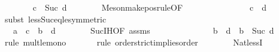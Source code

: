 \begin{isabellebody}
\isanewline
\ \ \ \ \isamarkupfalse%
\ {}{\isacharcolon}{\kern0pt}\ {\isachardoublequoteopen}c\ {\isacharless}{\kern0pt}\ Suc\ d{\isachardoublequoteclose}\isanewline
\ \ \ \ \ \ \isamarkupfalse%
\ Meson{\isachardot}{\kern0pt}make{\isacharunderscore}{\kern0pt}pos{\isacharunderscore}{\kern0pt}rule{\isacharprime}{\kern0pt}{\isacharbrackleft}{\kern0pt}OF\ {}\ {}{\isacharbrackright}{\kern0pt}\isanewline
\ \ \ \ \ \ \isacommand{{\isachardot}{\kern0pt}}\isamarkupfalse%
\isanewline
\isanewline
\ \ \ \ \isamarkupfalse%
\ {}{\isacharcolon}{\kern0pt}\ {\isachardoublequoteopen}c\ {\isasymle}\ d{\isachardoublequoteclose}\isanewline
\ \ \ \ \ \ \isamarkupfalse%
{\isacharparenleft}{\kern0pt}subst\ less{\isacharunderscore}{\kern0pt}Suc{\isacharunderscore}{\kern0pt}eq{\isacharunderscore}{\kern0pt}le{\isacharbrackleft}{\kern0pt}symmetric{\isacharbrackright}{\kern0pt}{\isacharparenright}{\kern0pt}\isanewline
\ \ \ \ \ \ \isamarkupfalse%
\ {}\isanewline
\ \ \ \ \ \ \isacommand{{\isachardot}{\kern0pt}}\isamarkupfalse%
\isanewline
\ \ \ \ \ \ \ \ \ \ \ \ \ \ \ \ \ \isanewline
\isanewline
\ \ \ \ \isamarkupfalse%
\ {}{\isacharcolon}{\kern0pt}\ {\isachardoublequoteopen}a\ {\isacharasterisk}{\kern0pt}\ c\ {\isasymle}\ b\ {\isacharasterisk}{\kern0pt}\ d{\isachardoublequoteclose}\isanewline
\ \ \ \ \ \ \isamarkupfalse%
\ Suc{\isachardot}{\kern0pt}IH{\isacharbrackleft}{\kern0pt}OF\ assms{\isacharparenleft}{\kern0pt}{}{\isacharparenright}{\kern0pt}\ {}{\isacharbrackright}{\kern0pt}\isanewline
\ \ \ \ \ \ \isacommand{{\isachardot}{\kern0pt}}\isamarkupfalse%
\isanewline
\isanewline
\ \ \ \ \isamarkupfalse%
\ {}{\isacharcolon}{\kern0pt}\ {\isachardoublequoteopen}b\ {\isacharasterisk}{\kern0pt}\ d\ {\isasymle}\ b\ {\isacharasterisk}{\kern0pt}\ {\isacharparenleft}{\kern0pt}Suc\ d{\isacharparenright}{\kern0pt}{\isachardoublequoteclose}\isanewline
\ \ \ \ \ \ \isamarkupfalse%
{\isacharparenleft}{\kern0pt}rule\ mult{\isacharunderscore}{\kern0pt}le{\isacharunderscore}{\kern0pt}mono{}{\isacharparenright}{\kern0pt}\isanewline
\ \ \ \ \ \ \isamarkupfalse%
{\isacharparenleft}{\kern0pt}rule\ order{\isachardot}{\kern0pt}strict{\isacharunderscore}{\kern0pt}implies{\isacharunderscore}{\kern0pt}order{\isacharparenright}{\kern0pt}\isanewline
\ \ \ \ \ \ \isamarkupfalse%
\ Nat{\isachardot}{\kern0pt}lessI\isanewline

\end{isabellebody}
